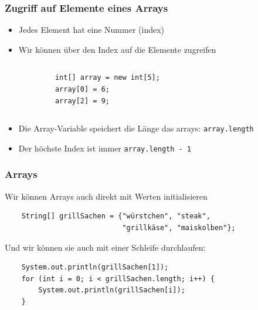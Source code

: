\documentclass{../../presentation}
\begin{document}
\begin{frame}[fragile]
	\frametitle{Zugriff auf Elemente eines Arrays}
	\begin{itemize}
		\item Jedes Element hat eine Nummer (index)
		\item Wir können über den Index auf die Elemente zugreifen
	\end{itemize}
	\begin{columns}
		\begin{verbatim}
            int[] array = new int[5];
            array[0] = 6;
            array[2] = 9;
        \end{verbatim}

		\begin{center}
		\end{center}
	\end{columns}

	\vspace{0.5cm}

	\begin{itemize}
		\item Die Array-Variable speichert die Länge das arrays: \texttt{array.length}
		\item Der höchste Index ist immer \texttt{array.length - 1}
	\end{itemize}
\end{frame}

\begin{frame}[fragile]
	\frametitle{Arrays}
	Wir können Arrays auch direkt mit Werten initialisieren
	\begin{verbatim}
    String[] grillSachen = {"würstchen", "steak", 
                            "grillkäse", "maiskolben"};
    \end{verbatim}
	Und wir können sie auch mit einer Schleife durchlaufen:
	\begin{verbatim}
    System.out.println(grillSachen[1]);
    for (int i = 0; i < grillSachen.length; i++) {
        System.out.println(grillSachen[i]);
    }
    \end{verbatim}
\end{frame}
\end{document}
